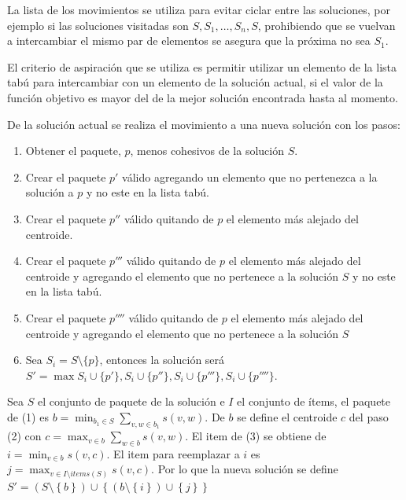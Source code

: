 La lista de los movimientos se utiliza para evitar ciclar entre las soluciones, por ejemplo si las soluciones visitadas son $S, S_1, \ldots, S_n, S$, prohibiendo que se vuelvan a intercambiar el mismo par de elementos se asegura que la próxima no sea $S_1$.

El criterio de aspiración que se utiliza es permitir utilizar un elemento de la lista tabú para intercambiar con un elemento de la solución actual, si el valor de la función objetivo es mayor del de la mejor solución encontrada hasta al momento.

De la solución actual se realiza el movimiento a una nueva solución con los pasos:
\begin{enumerate}
	\item Obtener el paquete, $p$, menos cohesivos de la solución $S$.
	\item Crear el paquete $p'$ válido agregando un elemento que no pertenezca a la solución a $p$ y no este en la lista tabú.
	\item Crear el paquete $p''$ válido quitando de $p$ el elemento más alejado del centroide.
	\item Crear el paquete $p'''$ válido quitando de $p$ el elemento más alejado del centroide y agregando el elemento que no pertenece a la solución $S$ y no este en la lista tabú.
	\item Crear el paquete $p''''$ válido quitando de $p$ el elemento más alejado del centroide y agregando el elemento que no pertenece a la solución $S$
	\item Sea $S_{i} = S\setminus \{p\}$, entonces la solución será\\
	$S' = \max{S_{i}\cup\{p'\}, S_{i}\cup\{p''\}, S_{i}\cup\{p'''\}, S_{i}\cup\{p''''\}}$.
\end{enumerate}

Sea $S$ el conjunto de paquete de la solución e $I$ el conjunto de ítems, el paquete de (1) es $b = \min_{b_1 \in S}{\sum_{v,w \in b_1}{s(v,w)}}$. De $b$ se define el centroide $c$ del paso (2) con $c = \max_{v \in b}{\sum_{w \in b}{s(v,w)}}$. El item de (3) se obtiene de $i = \min_{v \in b}{s(v,c)}$. El item para reemplazar a $i$ es $j = \max_{v \in I \setminus items(S)}{s(v,c)}$. Por lo que la nueva solución se define $S' = (S \setminus \left\{b\right\}) \cup \left\{(b \setminus \left\{i\right\})\cup\left\{j\right\}\right\}$

